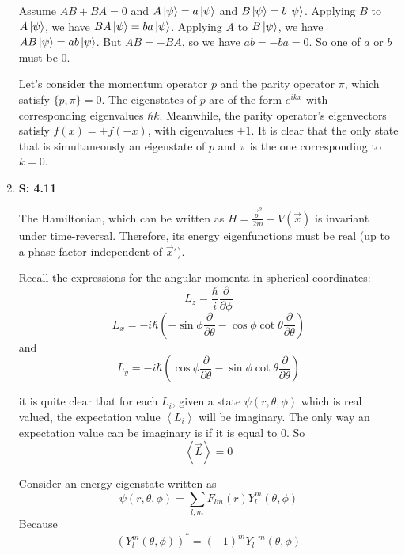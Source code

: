 \documentclass[12pt, letterpaper]{article}
\begin{document}
\begin{enumerate}
    Assume $AB+BA=0$ and $A\ket{\psi}=a\ket{\psi}$ and $B\ket{\psi}=b\ket{\psi}$. Applying $B$ to $A\ket{\psi}$, we have $BA\ket{\psi}=ba\ket{\psi}$. Applying $A$ to $B\ket{\psi}$, we have $AB\ket{\psi}=ab\ket{\psi}$. But $AB=-BA$, so we have $ab=-ba=0$. So one of $a$ or $b$ must be $0$.
    
    Let's consider the momentum operator $p$ and the parity operator $\pi$, which satisfy $\{p,\pi\}=0$. The eigenstates of $p$ are of the form $e^{ikx}$ with corresponding eigenvalues $\hbar k$. Meanwhile, the parity operator's eigenvectors satisfy $f(x)=\pm f(-x)$, with eigenvalues $\pm1$. It is clear that the only state that is simultaneously an eigenstate of $p$ and $\pi$ is the one corresponding to $k=0$. 
    
    
    \item[] \textbf{S: 4.11}
    
     The Hamiltonian, which can be written as $H=\frac{\vec{p}^2}{2m}+V(\vec{x})$ is invariant under time-reversal. Therefore, its energy eigenfunctions must be real (up to a phase factor independent of $\vec{x}'$). 
    
    Recall the expressions for the angular momenta in spherical coordinates: 
    \begin{equation}
        L_z=\frac{\hbar}{i}\frac{\partial}{\partial \phi}
    \end{equation}
    \begin{equation}
        L_x=-i\hbar \left(-\sin{\phi}\frac{\partial}{\partial \theta}-\cos{\phi}\cot{\theta}\frac{\partial}{\partial \theta}\right)
    \end{equation}
    and 
    \begin{equation}
        L_y=-i\hbar \left(\cos{\phi}\frac{\partial}{\partial \theta}-\sin{\phi}\cot{\theta}\frac{\partial}{\partial \theta}\right)
    \end{equation}
    
    it is quite clear that for each $L_i$, given a state $\psi(r,\theta,\phi)$ which is real valued, the expectation value $\left<L_i\right>$ will be imaginary. The only way an expectation value can be imaginary is if it is equal to $0$. So
    \begin{equation}
        \left<\vec{L}\right>=0
    \end{equation}
    
    Consider an energy eigenstate written as 
    \begin{equation}
        \psi(r,\theta,\phi)=\sum_{l,m}F_{lm}(r)Y_{l}^m(\theta,\phi)
    \end{equation}
    Because 
    \begin{equation}
        \left(Y^m_l(\theta,\phi)\right)^*=(-1)^m Y_l^{-m}(\theta,\phi)
    \end{equation}
    

\end{enumerate}
\end{document}
